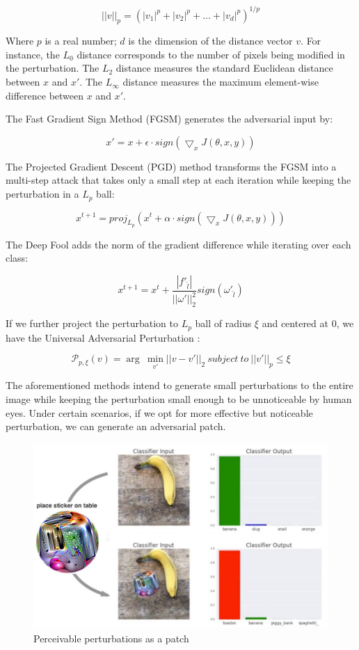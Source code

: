 $$ ||v||_p = (|v_1|^p + |v_2|^p + \dots + |v_d|^p)^{1/p} $$

Where $p$ is a real number; $d$ is the dimension of the distance vector $v$. For instance, the $L_0$ distance corresponds to the number of pixels being modified in the perturbation. The $L_2$ distance measures the standard Euclidean distance between $x$ and $x'$. The $L_\infty$ distance measures the maximum element-wise difference between $x$ and $x'$.

The Fast Gradient Sign Method (FGSM) \citep{goodfellow2015explaining} generates the adversarial input by:

$$ x' = x + \epsilon \cdot sign(\bigtriangledown_x J(\theta, x, y)) $$

The Projected Gradient Descent (PGD) \citep{madry2017towards} method transforms the FGSM into a multi-step attack that takes only a small step at each iteration while keeping the perturbation in a $L_p$ ball:

$$ x^{t+1} = proj_{L_p}(x^t + \alpha \cdot sign(\bigtriangledown_x J(\theta, x, y))) $$

The Deep Fool \citep{moosavidezfooli2016deepfool} adds the norm of the gradient difference while iterating over each class:

$$ x^{t+1} = x^t + \frac{|f'_{\hat{l}}|}{||\omega'||^2_2} sign(\omega'_{\hat{l}})$$

If we further project the perturbation to $L_p$ ball of radius $\xi$ and centered at 0, we have the Universal Adversarial Perturbation \citep{moosavidezfooli2017universal}:

$$\mathcal{P}_{p, \xi}(v) = \arg\ \underset{v'}{\min}||v-v'||_2\ subject\ to\ ||v'||_p\leq\xi$$


The aforementioned methods intend to generate small perturbations to the entire image while keeping the perturbation small enough to be unnoticeable by human eyes. Under certain scenarios, if we opt for more effective but noticeable perturbation, we can generate an adversarial patch.

\begin{figure}[H]
\centering
\includegraphics[scale=0.5]{figures/chapter_intro/adv_patch.jpg}
\caption{Perceivable perturbations as a patch}
\label{fig.adv_patch}
\end{figure}


